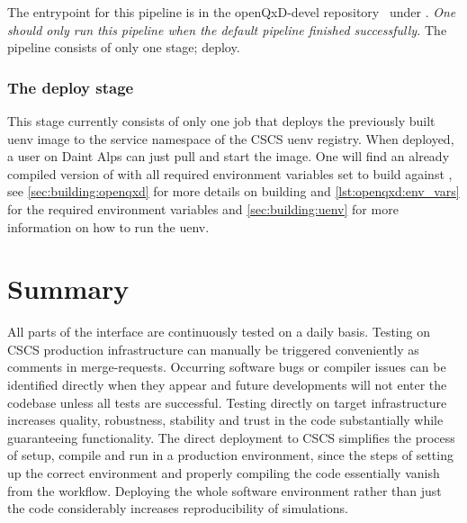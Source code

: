 The entrypoint for this pipeline is in the openQxD-devel repository~\cite{gitlab:openqxd-devel} under .
\emph{One should only run this pipeline when the default pipeline finished successfully.}
The pipeline consists of only one stage; deploy.

\subsubsection{The deploy stage}

This stage currently consists of only one job that deploys the previously built uenv image to the service namespace of the CSCS uenv registry.
When deployed, a user on Daint Alps can just pull and start the image.
One will find an already compiled version of \quda with all required environment variables set to build \openqxd against \quda, see \cref{sec:building:openqxd} for more details on building \openqxd and \cref{lst:openqxd:env_vars} for the required environment variables and \cref{sec:building:uenv} for more information on how to run the uenv.

\section{Summary}
\label{sec:cicd:summary}

All parts of the interface are continuously tested on a daily basis.
Testing on CSCS production infrastructure can manually be triggered conveniently as comments in merge-requests.
Occurring software bugs or compiler issues can be identified directly when they appear and future developments will not enter the codebase unless all tests are successful.
Testing directly on target infrastructure increases quality, robustness, stability and trust in the code substantially while guaranteeing functionality.
The direct deployment to CSCS simplifies the process of setup, compile and run in a production environment, since the steps of setting up the correct environment and properly compiling the code essentially vanish from the workflow.
Deploying the whole software environment rather than just the code considerably increases reproducibility of simulations.

